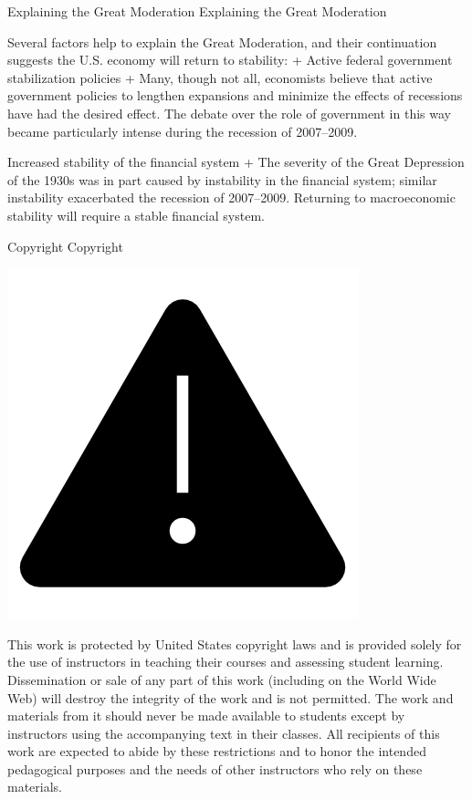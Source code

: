 \documentclass[
  12pt,
  ignorenonframetext,
]{beamer}
\begin{document}
\begin{frame}{Explaining the Great Moderation}
\label{explaining-the-great-moderation}
Explaining the Great Moderation

Several factors help to explain the Great Moderation, and their
continuation suggests the U.S. economy will return to stability: +
Active federal government stabilization policies + Many, though not all,
economists believe that active government policies to lengthen
expansions and minimize the effects of recessions have had the desired
effect. The debate over the role of government in this way became
particularly intense during the recession of 2007--2009.

Increased stability of the financial system + The severity of the Great
Depression of the 1930s was in part caused by instability in the
financial system; similar instability exacerbated the recession of
2007--2009. Returning to macroeconomic stability will require a stable
financial system.
\end{frame}

\begin{frame}{Copyright}
\label{copyright}
Copyright

\includegraphics[width=\textwidth,height=0.99\textheight]{imgs3/img_slide48a.png}

This work is protected by United States copyright laws and is provided
solely for the use of instructors in teaching their courses and
assessing student learning. Dissemination or sale of any part of this
work (including on the World Wide Web) will destroy the integrity of the
work and is not permitted. The work and materials from it should never
be made available to students except by instructors using the
accompanying text in their classes. All recipients of this work are
expected to abide by these restrictions and to honor the intended
pedagogical purposes and the needs of other instructors who rely on
these materials.
\end{frame}
\end{document}
